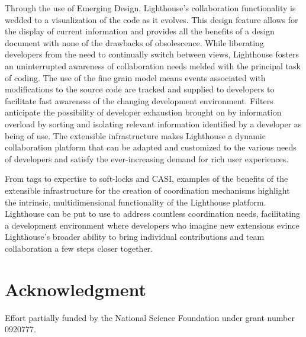 \documentclass[10pt, conference, compsocconf]{IEEEtran}
\begin{document}
Through the use of Emerging Design, Lighthouse's collaboration functionality is wedded to a visualization of the code as it evolves.  This design feature allows for the display of current information and provides all the benefits of a design document with none of the drawbacks of obsolescence.  While liberating developers from the need to continually switch between views, Lighthouse fosters an uninterrupted awareness of collaboration needs melded with the principal task of coding.  The use of the fine grain model means events associated with modifications to the source code are tracked and supplied to developers to facilitate fast awareness of the changing development environment.  Filters anticipate the possibility of developer exhaustion brought on by information overload by sorting and isolating relevant information identified by a developer as being of use.  The extensible infrastructure makes Lighthouse a dynamic collaboration platform that can be adapted and customized to the various needs of developers and satisfy the ever-increasing demand for rich user experiences.

From tags to expertise to soft-locks and CASI, examples of the benefits of the extensible infrastructure for the creation of coordination mechanisms highlight the intrinsic, multidimensional functionality of the Lighthouse platform.  Lighthouse can be put to use to address countless coordination needs, facilitating a development environment where developers who imagine new extensions evince Lighthouse's broader ability to bring individual contributions and team collaboration a few steps closer together.

\section*{Acknowledgment}

Effort partially funded by the National Science Foundation under grant number 0920777.


%
%
\end{document}
